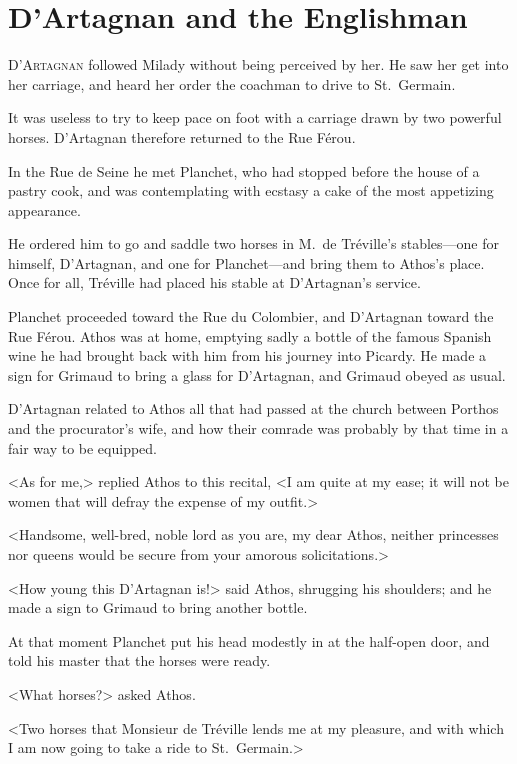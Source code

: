 
\chapter{D'Artagnan and the Englishman} 
	
	\lettrine{D}{'Artagnan} followed Milady without being perceived by her. He saw her get into her carriage, and heard her order the coachman to drive to St.~Germain. 

\zz
It was useless to try to keep pace on foot with a carriage drawn by two powerful horses. D'Artagnan therefore returned to the Rue Férou. 

In the Rue de Seine he met Planchet, who had stopped before the house of a pastry cook, and was contemplating with ecstasy a cake of the most appetizing appearance. 

He ordered him to go and saddle two horses in M.~de Tréville's stables—one for himself, D'Artagnan, and one for Planchet—and bring them to Athos's place. Once for all, Tréville had placed his stable at D'Artagnan's service. 

Planchet proceeded toward the Rue du Colombier, and D'Artagnan toward the Rue Férou. Athos was at home, emptying sadly a bottle of the famous Spanish wine he had brought back with him from his journey into Picardy. He made a sign for Grimaud to bring a glass for D'Artagnan, and Grimaud obeyed as usual. 

D'Artagnan related to Athos all that had passed at the church between Porthos and the procurator's wife, and how their comrade was probably by that time in a fair way to be equipped. 

<As for me,> replied Athos to this recital, <I am quite at my ease; it will not be women that will defray the expense of my outfit.> 

<Handsome, well-bred, noble lord as you are, my dear Athos, neither princesses nor queens would be secure from your amorous solicitations.> 

<How young this D'Artagnan is!> said Athos, shrugging his shoulders; and he made a sign to Grimaud to bring another bottle. 

At that moment Planchet put his head modestly in at the half-open door, and told his master that the horses were ready. 

<What horses?> asked Athos. 

<Two horses that Monsieur de Tréville lends me at my pleasure, and with which I am now going to take a ride to St.~Germain.> 

